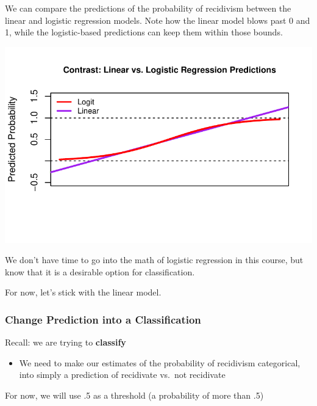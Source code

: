 \documentclass[
  letterpaper,
  DIV=11,
  numbers=noendperiod]{scrreprt}
\newenvironment{Shaded}{\begin{snugshade}}{\end{snugshade}}
\newcommand{\CommentTok}[1]{\textcolor[rgb]{0.37,0.37,0.37}{#1}}
\newcommand{\DecValTok}[1]{\textcolor[rgb]{0.68,0.00,0.00}{#1}}
\newcommand{\FunctionTok}[1]{\textcolor[rgb]{0.28,0.35,0.67}{#1}}
\newcommand{\NormalTok}[1]{\textcolor[rgb]{0.00,0.23,0.31}{#1}}
\newcommand{\OtherTok}[1]{\textcolor[rgb]{0.00,0.23,0.31}{#1}}
\newcommand{\SpecialCharTok}[1]{\textcolor[rgb]{0.37,0.37,0.37}{#1}}
\providecommand{\tightlist}{%
  \setlength{\itemsep}{0pt}\setlength{\parskip}{0pt}}\usepackage{longtable,booktabs,array}
\begin{document}
We can compare the predictions of the probability of recidivism between
the linear and logistic regression models. Note how the linear model
blows past 0 and 1, while the logistic-based predictions can keep them
within those bounds.

\includegraphics{09-Fairness_files/figure-pdf/unnamed-chunk-7-1.pdf}

We don't have time to go into the math of logistic regression in this
course, but know that it is a desirable option for classification.

For now, let's stick with the linear model.

\hypertarget{change-prediction-into-a-classification}{%
\subsubsection{Change Prediction into a
Classification}\label{change-prediction-into-a-classification}}

Recall: we are trying to \textbf{classify}

\begin{itemize}
\tightlist
\item
  We need to make our estimates of the probability of recidivism
  categorical, into simply a prediction of recidivate vs.~not recidivate
\end{itemize}

For now, we will use .5 as a threshold (a probability of more than .5)

\begin{Shaded}
\end{Shaded}
\end{document}
